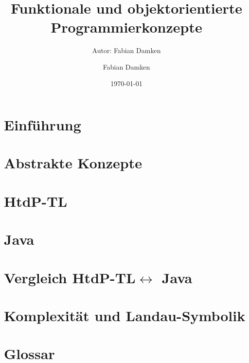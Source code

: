 \documentclass[a4paper, 11pt, accentcolor = tud3b]{tudreport}
\title{Funktionale und objektorientierte Programmierkonzepte}
\subtitle{Autor: Fabian Damken}
\author{Fabian Damken}
\date{\today}
\providecommand{\racket}{HtdP-TL}
\begin{document}
	

    \maketitle
    \tableofcontents
    \listoftodos


    \chapter{Einführung}
	    \label{c:einfuehrung}
    
        

	\chapter{Abstrakte Konzepte}
		\label{c:abstrakte_konzepte}
	
		

    \chapter{\racket}
	    \label{c:racket}
    
        

    \chapter{Java}
	    \label{c:java}
    
        
    
    \chapter{Vergleich \racket $ \leftrightarrow $ Java}
	    \label{c:vergleich_racket_java}
    
	    
    
    \chapter{Komplexität und Landau-Symbolik}
	    \label{c:komplexitaet}
    
	    

    \chapter{Glossar}
	    \label{c:glossar}
    
    
    
\end{document}
